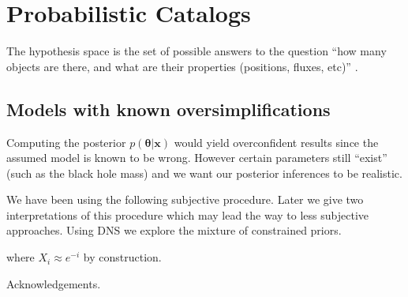 \documentclass[
  ,final            %
  ]
  {aipproc}
\newcommand{\pars}{\boldsymbol{\theta}}
\newcommand{\data}{\mathbf{x}}
\begin{document}
\section{Probabilistic Catalogs}
The hypothesis space is the set of possible answers to the question
``how many objects are there, and what are their properties (positions, fluxes,
etc)'' \citep{starfield}.



\subsection{Models with known oversimplifications}
Computing the posterior $p(\pars | \data)$ would yield overconfident results
since the assumed model is known to be wrong. However certain parameters still
``exist'' (such as the black hole mass) and we want our posterior inferences
to be realistic.

We have been using the following subjective procedure. Later we give two
interpretations of this procedure which may lead the way to less subjective
approaches.
Using DNS we explore the mixture of constrained priors.

where $X_i \approx e^{-i}$ by construction.


\begin{theacknowledgments}
Acknowledgements.
\end{theacknowledgments}


\end{document}
